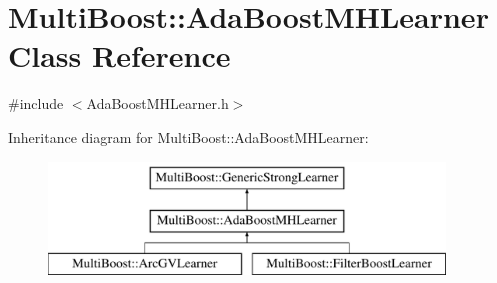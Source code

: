 \hypertarget{classMultiBoost_1_1AdaBoostMHLearner}{\section{Multi\-Boost\-:\-:Ada\-Boost\-M\-H\-Learner Class Reference}
\label{classMultiBoost_1_1AdaBoostMHLearner}
}


{\ttfamily \#include $<$Ada\-Boost\-M\-H\-Learner.\-h$>$}

Inheritance diagram for Multi\-Boost\-:\-:Ada\-Boost\-M\-H\-Learner\-:\begin{figure}[H]
\begin{center}
\leavevmode
\includegraphics[height=3.000000cm]{classMultiBoost_1_1AdaBoostMHLearner}
\end{center}
\end{figure}
